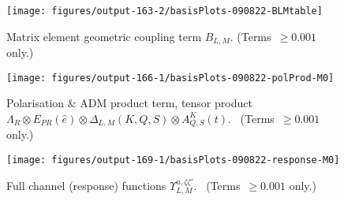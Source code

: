 \documentclass[10pt]{article}
\begin{document}
\begin{figure}[H]
\begin{center}
\texttt{[image: figures/output-163-2/basisPlots-090822-BLMtable]}
\caption{{Matrix element geometric coupling term \(B_{L,M}\).
(Terms~\(\ge0.001\) only.)
{\label{776753}}%
}}
\end{center}
\end{figure}
\begin{figure}[H]
\begin{center}
\texttt{[image: figures/output-166-1/basisPlots-090822-polProd-M0]}
\caption{{Polarisation \& ADM product term, tensor product \(\Lambda_{R}\otimes E_{PR}(\hat{e})\otimes\Delta_{L,M}(K,Q,S)\otimes
A^{K}_{Q,S}(t)\).~
(Terms~\(\ge0.001\) only.) ~
{\label{652406}}%
}}
\end{center}
\end{figure}
\begin{figure}[H]
\begin{center}
\texttt{[image: figures/output-169-1/basisPlots-090822-response-M0]}
\caption{{Full channel (response) functions \(\varUpsilon_{L,M}^{u,\zeta\zeta'}\).~
(Terms~\(\ge0.001\) only.) ~
{\label{676540}}%
}}
\end{center}
\end{figure}








\end{document}
